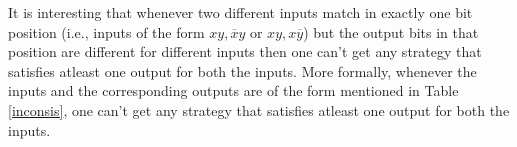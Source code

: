 \documentclass[]{svjour3}
\begin{document}

It is interesting that whenever two different inputs match in exactly one bit position (i.e., inputs of the form $xy, \overline{x}y$ or $xy, x\overline{y}$) but the output bits in that position are different for different inputs then one can't get any strategy that satisfies atleast one output for both the inputs. More formally, whenever the inputs and the corresponding outputs are of the form mentioned in Table \ref{inconsis}, one can't get any strategy that satisfies atleast one output for both the inputs.
\end{document}
